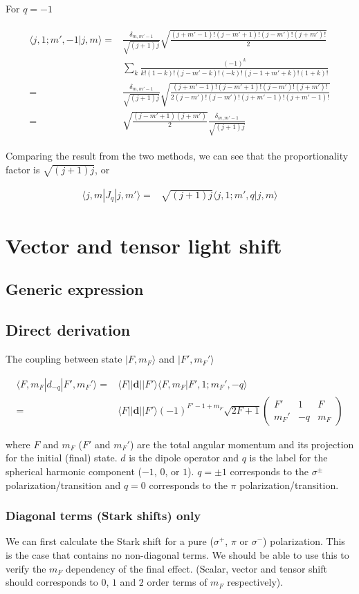 \documentclass[10pt,fleqn]{article}
\newcommand{\eqar}[1]
{
  \begin{align}
    #1
  \end{align}
}
\begin{document}
For $q=-1$
\eqar{
  \begin{split}
    \langle j,1;m',-1|j,m\rangle=&\frac{\delta_{m,m'-1}}{\sqrt{(j+1)j}}\sqrt{\frac{(j+m'-1)!(j-m'+1)!(j-m')!(j+m')!}{2}}\\
                                 &\sum_k\frac{(-1)^k}{k!(1-k)!(j-m'-k)!(-k)!(j-1+m'+k)!(1+k)!}\\
    =&\frac{\delta_{m,m'-1}}{\sqrt{(j+1)j}}\sqrt{\frac{(j+m'-1)!(j-m'+1)!(j-m')!(j+m')!}{2(j-m')!(j-m')!(j+m'-1)!(j+m'-1)!}}\\
    =&\sqrt{\frac{(j-m'+1)(j+m')}{2}}\frac{\delta_{m,m'-1}}{\sqrt{(j+1)j}}
  \end{split}
}
Comparing the result from the two methods,
we can see that the proportionality factor is $\sqrt{(j+1)j}$, or
\eqar{
  \langle j,m|J_q|j,m'\rangle=&\sqrt{(j+1)j}\langle j,1;m',q|j,m\rangle
}


\section{Vector and tensor light shift}

\subsection{Generic expression}

\subsection{Direct derivation}
The coupling between state $|F,m_F\rangle$ and $|F',m_F'\rangle$
\eqar{
  \langle F,m_F|d_{-q}|F',m_F'\rangle=&\langle F||\mathbf{d}||F'\rangle\langle F,m_F|F',1;m_F',-q\rangle\\
  =&\langle F||\mathbf{d}||F'\rangle (-1)^{F'-1+m_F}\sqrt{2F+1}
  \begin{pmatrix}
    F'&1&F\\
    m_F'&-q&m_F
  \end{pmatrix}
}
where $F$ and $m_F$ ($F'$ and $m_F'$) are the total angular momentum and its projection
for the initial (final) state. $d$ is the dipole operator and $q$ is the label
for the spherical harmonic component ($-1$, $0$, or $1$).
$q=\pm1$ corresponds to the $\sigma^\pm$ polarization/transition
and $q=0$ corresponds to the $\pi$ polarization/transition.\\

\subsubsection{Diagonal terms (Stark shifts) only}\label{stark-shift-explicit}
We can first calculate the Stark shift for a pure
($\sigma^+$, $\pi$ or $\sigma^-$) polarization.
This is the case that contains no non-diagonal terms.
We should be able to use this to verify the $m_F$ dependency of the final effect.
(Scalar, vector and tensor shift should corresponds to $0$, $1$ and $2$ order terms
of $m_F$ respectively).\\
\end{document}
